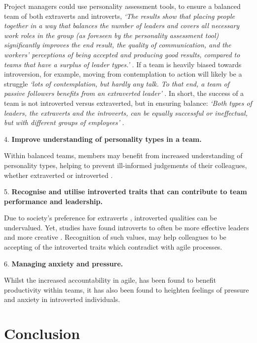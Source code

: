 \documentclass{scrartcl}
\begin{document}
Project managers could use personality assessment tools, to ensure a balanced team of both extraverts and introverts, \textit{`The results show that placing people together in a way that balances the number of leaders and covers all necessary work roles in the group (as foreseen by the personality assessment tool) significantly improves the end result, the quality of communication, and the workers’ perceptions of being accepted and producing good results, compared to teams that have a surplus of leader types.'} \cite{Lykourentzou}. If a team is heavily biased towards introversion, for example, moving from contemplation to action will likely be a struggle \textit{`lots of contemplation, but hardly any talk. To that end, a team of passive followers benefits from an extraverted leader'} \cite[p. 1]{Harvard}. In short, the success of a team is not introverted versus extraverted, but in ensuring balance: \textit{`Both types of leaders, the extraverts and the introverts, can be equally successful or ineffectual, but with different groups of employees'} \cite[p. 1]{Harvard}.  

4. \textbf{Improve understanding of personality types in a team.}

Within balanced teams, members may benefit from increased understanding of personality types, helping to prevent ill-informed judgements of their colleagues, whether extraverted or introverted \cite{LicorishPhilpottMacDonell}. 

5. \textbf{Recognise and utilise introverted traits that can contribute to team performance and leadership.}

Due to society's preference for extraverts \cite{Cain}, introverted qualities can be undervalued. Yet, studies have found introverts to often be more effective leaders \cite{Morrish} and more creative \cite{feist}. Recognition of such values, may help colleagues to be accepting of the introverted traits which contradict with agile processes.

6. \textbf{Managing anxiety and pressure.}

Whilst the increased accountability in agile, has been found to benefit productivity within teams, it has also been found to heighten feelings of pressure and anxiety in introverted individuals. 

\section{Conclusion}
\end{document}
